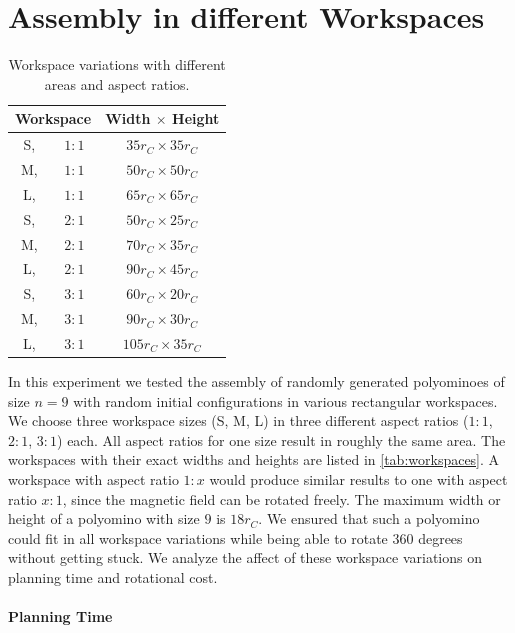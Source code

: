 \section{Assembly in different Workspaces}
\label{sec:AFBS}

\begin{table}
	\centering
	\begin{tabular}{|c c|c|}
		\hline
		\multicolumn{2}{|c|}{\textbf{Workspace}} & \textbf{Width $\times$ Height}\\
		\hline
		S,& $ 1:1 $ & $35 r_C \times 35 r_C$\\
		\hline
		M,& $ 1:1 $ & $50 r_C \times 50 r_C$ \\
		\hline
		L,& $ 1:1 $ & $65 r_C \times 65 r_C$ \\
		\hline
		S,& $ 2:1 $ & $50 r_C \times 25 r_C$\\
		\hline
		M,& $ 2:1 $ & $70 r_C \times 35 r_C$ \\
		\hline
		L,& $ 2:1 $ & $90 r_C \times 45 r_C$ \\
		\hline
		S,& $ 3:1 $ & $60 r_C \times 20 r_C$\\
		\hline
		M,& $ 3:1 $ & $90 r_C \times 30 r_C$ \\
		\hline
		L,& $ 3:1 $ & $105 r_C \times 35 r_C$ \\
		\hline
	\end{tabular}
	\caption{Workspace variations with different areas and aspect ratios.}
	\label{tab:workspaces}
\end{table}

In this experiment we tested the assembly of randomly generated polyominoes of size $n=9$ with random initial configurations in various rectangular workspaces.
We choose three workspace sizes (S, M, L) in three different aspect ratios ($ 1:1 $, $ 2:1 $, $ 3:1 $) each.
All aspect ratios for one size result in roughly the same area. The workspaces with their exact widths and heights are listed in \autoref{tab:workspaces}.
A workspace with aspect ratio $ 1:x $ would produce similar results to one with aspect ratio $ x:1 $, since the magnetic field can be rotated freely.
The maximum width or height of a polyomino with size $9$ is $18 r_C$.
We ensured that such a polyomino could fit in all workspace variations while being able to rotate $360$ degrees without getting stuck.
We analyze the affect of these workspace variations on planning time and rotational cost.

\paragraph{Planning Time} 


